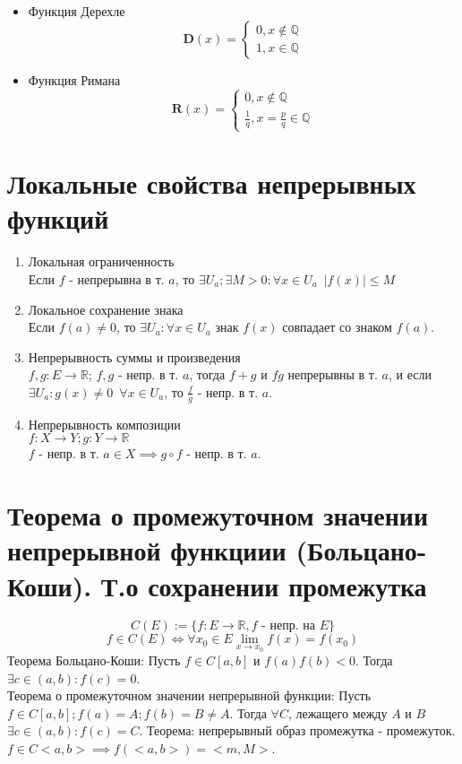 \documentclass[11pt, a4paper]{article}
\def\R{\mathbb{R}}
\def\Q{\mathbb{Q}}
\def\sp{\, \, \,}
\begin{document}
\begin{enumerate}
\begin{itemize}
            \item Функция Дерехле
            $$\mathbf{D}(x) = \begin{cases}
                0, x \not\in \Q \\
                1, x \in \Q
            \end{cases}$$
            \item Функция Римана
            $$\mathbf{R}(x) = \begin{cases}
                0, x \not\in \Q \\
                \frac{1}{q}, x = \frac{p}{q} \in \Q
            \end{cases}$$
        \end{itemize}
    \end{enumerate}
    
    \section{Локальные свойства непрерывных функций}
    \begin{enumerate}
        \item Локальная ограниченность\\
        Если $f$ - непрерывна в т. $a$, то $\exists U_a; \exists M > 0: \forall x \in U_a \sp |f(x)| \leq M$
        \item Локальное сохранение знака\\
        Если $f(a) \neq 0$, то $\exists U_a : \forall x \in U_a$ знак $f(x)$ совпадает со знаком $f(a)$.
        \item Непрерывность суммы и произведения\\
        $f,g: E \to \R$; $f, g$ - непр. в т. $a$, тогда $f+g$ и $fg$ непрерывны в т. $a$, и если $\exists U_a : g(x) \neq 0 \sp \forall x \in U_a$, то $\frac{f}{g}$ - непр. в т. $a$.
        \item Непрерывность композиции\\
        $f: X \to Y; g: Y \to \R$\\
        $f$ - непр. в т. $a \in X \implies g \circ f$ - непр. в т. $a$.
    \end{enumerate}

    \section{Теорема о промежуточном значении непрерывной функциии (Больцано-Коши). Т.о сохранении промежутка}
    $$C(E) := \{f: E \to \R , f \text{ - непр. на } E\}$$
    $$f \in C (E) \iff \forall x_0 \in E \lim_{x \to x_0} f(x) = f(x_0)$$
    Теорема Больцано-Коши: Пусть $f \in C[a,b]$ и $f(a)f(b) < 0$. Тогда $\exists c \in (a,b): f(c) = 0$.\\
    Теорема о промежуточном значении непрерывной функции: Пусть $f \in C[a,b]; f(a) = A; f(b) = B \neq A$. Тогда $\forall C$, лежащего между $A$ и $B$ $\exists c \in (a,b): f(c) = C$.
    Теорема: непрерывный образ промежутка - промежуток.\\
    $f \in C <a,b> \implies f(<a, b>) = <m, M>$.
\end{document}
